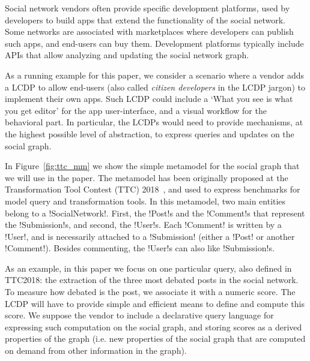 \begin{multicols}{2}


Social network vendors often provide specific development platforms, used by developers to
build apps that extend the functionality of the social network. Some networks are associated
with marketplaces where developers can publish such apps, and end-users can buy them. 
Development platforms typically include APIs that allow analyzing and updating the social
network graph. 

As a running example for this paper, we consider a scenario where a vendor adds a LCDP to allow
end-users (also called \emph{citizen developers} in the LCDP jargon) to implement their own apps.
Such LCDP could include a `What you see is what you get editor' for the app user-interface, and a visual workflow for
the behavioral part. In particular, the LCDPs would need to provide mechanisms, at the highest
possible level of abstraction, to express queries and updates on the social graph.

In Figure~\ref{fig:ttc_mm} we show the simple metamodel for the social graph that we will use in
the paper. The metamodel has been originally proposed at the Transformation Tool Contest (TTC)
2018~\cite{Garcia2018:TTC}, and used to express benchmarks for model query and transformation
tools. In this metamodel, two main entities belong to a !SocialNetwork!. First, the !Post!s and
the !Comment!s that represent the !Submission!s, and second, the !User!s. Each !Comment! is
written by a !User!, and is necessarily attached to a !Submission! (either a !Post! or another
!Comment!). Besides commenting, the !User!s can also like !Submission!s. 

As an example, in this paper we focus on one particular query, also defined in TTC2018: the
extraction of the three most debated posts in the social network. To measure how debated is the
post, we associate it with a numeric score. The LCDP will have to provide simple and efficient
means to define and compute this score. We suppose the vendor to include a declarative query
language for expressing such computation on the social graph, and storing scores as a derived
properties of the graph (i.e. new properties of the social graph that are computed on demand
from other information in the graph). 

\end{multicols}

